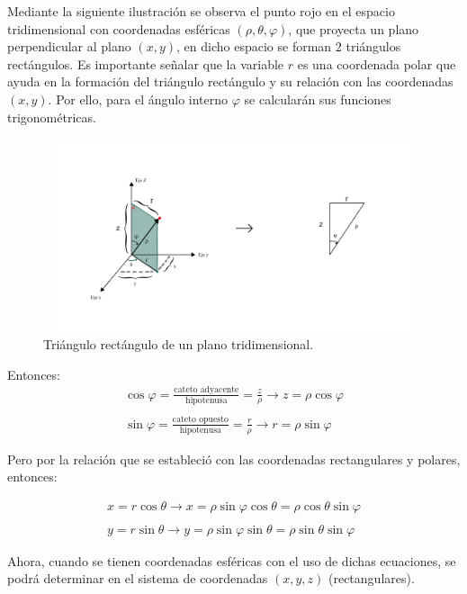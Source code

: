 Mediante la siguiente ilustración se observa el punto rojo en el espacio tridimensional con coordenadas esféricas ${\left(\rho,\theta,\varphi\right)}$, que proyecta un plano perpendicular al plano ${\left(x,y\right)}$, en dicho espacio se forman ${2}$ triángulos rectángulos. Es importante señalar que la variable ${r}$ es una coordenada polar que ayuda en la formación del triángulo rectángulo y su relación con las coordenadas ${\left(x,y\right)}$. Por ello, para el ángulo interno ${\varphi}$ se calcularán sus funciones trigonométricas.

\begin{figure}[H]
  \centering
  \includegraphics[width=11.17cm, height=5.67cm]{img/graph/coord_esf_2_rect_1.jpg}
  \caption{Triángulo rectángulo de un plano tridimensional.}
  \label{relacion_de_coordenadas}
\end{figure}

Entonces:
\begin{eqnarray*}
  \cos \varphi = \frac{\text{cateto adyacente}}{\text{hipotenusa}} = \frac{z}{\rho} \rightarrow z = \rho \cos \varphi\\\\
  \sin \varphi = \frac{\text{cateto opuesto}}{\text{hipotenusa}} = \frac{r}{\rho} \rightarrow r = \rho \sin \varphi
\end{eqnarray*}

\vspace{4mm}
Pero por la relación que se estableció con las coordenadas rectangulares y polares, entonces:

\begin{eqnarray*}
  x = r \cos \theta \rightarrow x = \rho \sin \varphi \cos \theta = \rho \cos \theta \sin \varphi\\\\
  y = r \sin \theta \rightarrow y = \rho \sin \varphi \sin \theta = \rho \sin \theta \sin \varphi
\end{eqnarray*}

\vspace{4mm}
Ahora, cuando se tienen coordenadas esféricas con el uso de dichas ecuaciones, se podrá determinar en el sistema de coordenadas $(x,y,z)$ (rectangulares). \cite{matefacil}
